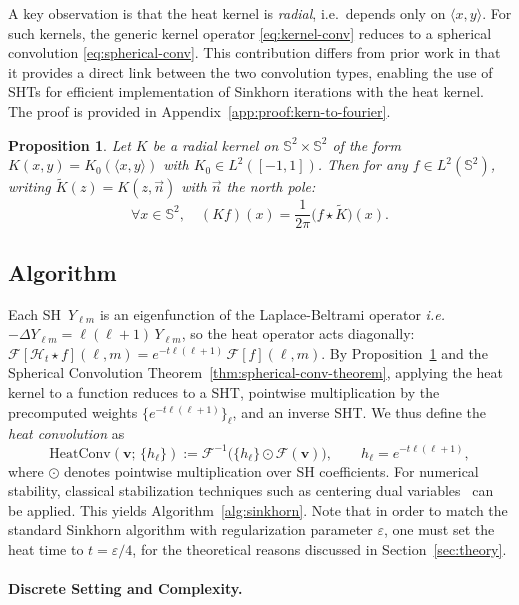 \documentclass{article}
\theoremstyle{plain}
\newtheorem{proposition}[theorem]{Proposition}
\theoremstyle{definition}
\theoremstyle{remark}
\renewcommand{\S}{\ensuremath{\mathbb{S}}}
\renewcommand{\vector}[1]{\mathrm{\mathbf{#1}}}
\begin{document}
A key observation is that the heat kernel is \emph{radial}, i.e.\ depends only on $\langle x,y\rangle$. For such kernels, the generic kernel operator \eqref{eq:kernel-conv} reduces to a spherical convolution \eqref{eq:spherical-conv}. This contribution differs from prior work  \cite{kondor2018generalization, sosnovik2021disco} in that it provides a direct link between the two convolution types, enabling the use of SHTs for efficient implementation of Sinkhorn iterations with the heat kernel. The proof is provided in Appendix~\ref{app:proof:kern-to-fourier}.

\begin{proposition}\label{prop:kern-to-fourier}
	Let $K$ be a radial kernel on $\S^2 \times \S^2$ of the form $K(x,y) = K_0(\langle x, y \rangle)$ with $K_0 \in L^2([-1,1])$. Then for any $f \in L^2(\S^2)$, writing $\tilde K(z) = K(z, \vec{n})$ with $\vec{n}$ the north pole:
	\[
	\forall x \in \S^2, \quad (Kf)(x) = \frac{1}{2\pi} \big( f \star \tilde K \big)(x).
	\]
\end{proposition}
\subsection{Algorithm}
Each SH \,$Y_{\ell m}$ is an eigenfunction of the Laplace-Beltrami operator \textit{i.e.}
$-\Delta Y_{\ell m} = \ell(\ell+1)\, Y_{\ell m}$,
so the heat operator acts diagonally: $\mathcal{F}[\mathcal{H}_t \star f](\ell,m) = e^{-t\ell(\ell+1)}\,\mathcal{F}[f](\ell,m)$. By Proposition~\ref{prop:kern-to-fourier} and the Spherical Convolution Theorem~\ref{thm:spherical-conv-theorem}, applying the heat kernel to a function reduces to a SHT, pointwise multiplication by the precomputed weights $\{e^{-t\ell(\ell+1)}\}_\ell$, and an inverse SHT. We thus define the \emph{heat convolution} as
\[
  \mathrm{HeatConv}(\vector{v};\,\{h_\ell\}) := \mathcal{F}^{-1}\bigl(\{h_\ell\} \odot \mathcal{F}(\vector{v})\bigr),
  \qquad h_\ell = e^{-t\ell(\ell+1)},
\]
where $\odot$ denotes pointwise multiplication over SH coefficients.  For numerical stability, classical stabilization techniques such as centering dual variables~\cite{sejourne2023unbalanced} can be applied.
This yields Algorithm~\ref{alg:sinkhorn}. Note that in order to match the standard Sinkhorn algorithm with regularization parameter $\varepsilon$, one must set the heat time to $t = \varepsilon/4$, for the theoretical reasons discussed in Section~\ref{sec:theory}.

\paragraph{Discrete Setting and Complexity.}
\end{document}
